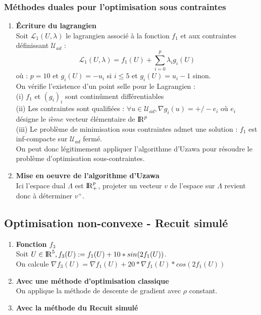 \documentclass[a4paper]{article}
\begin{document}
\subsubsection{Méthodes duales pour l'optimisation sous contraintes}


\begin{enumerate}
\item \textbf{Écriture du lagrangien}
\vspace{0.1cm}
\\ Soit $\mathcal{L}_{1}(U,\lambda)$ le lagrangien associé à la fonction $f_1$ et aux contraintes définissant $\mathcal{U}_{ad}$ : 
\[ \mathcal{L}_{1}(U,\lambda) = f_1(U) + \sum_{i = 0}^{p} \lambda_i g_i(U) \]
où : $p = 10$ et $g_i(U) = -u_i$ si $i \le 5$ et $g_i(U) = u_i-1$ sinon. 
\vspace{0.1cm}
\\ On vérifie l'existence d'un point selle pour le Lagrangien : 
\vspace{0.1cm}
\\ (i) $f_1$ et $(g_i)_i$ sont continûment différentiables
\\ (ii) Les contraintes sont qualifiées : $\forall{} u \in \mathcal{U}_{ad}, \nabla g_i(u) = +/- e_i$ où $e_i$ désigne le $ième$ vecteur élémentaire de ${\rm I\!R}^p$
\\ (iii) Le problème de minimisation sous contraintes admet une solution : $f_1$ est inf-compacte sur $\mathcal{U}_{ad}$ fermé.
\vspace{0.2cm}
\\ On peut donc légitimement appliquer l'algorithme d'Uzawa pour résoudre le problème d'optimisation sous-contraintes.
\item \textbf{Mise en oeuvre de l'algorithme d'Uzawa}
\vspace{0.1cm}
\\ Ici l'espace dual $\Lambda$ est ${\rm I\!R}^p_+$, projeter un vecteur $v$ de l'espace sur $\Lambda$ revient donc à déterminer $v^+$.

\end{enumerate}

\subsection{Optimisation non-convexe - Recuit simulé}

\begin{enumerate}
\item \textbf{Fonction $f_3$}
\vspace{0.1cm}
\\ Soit $U \in {\rm I\!R}^5, f_3(U) := f_1(U) + 10*sin(2f_1(U))$.
\\ On calcule $\nabla f_3(U) = \nabla f_1(U) + 20*\nabla f_1(U)*cos(2f_1(U)) $
\item \textbf{Avec une méthode d'optimisation classique}
\vspace{0.1cm}
\\ On applique la méthode de descente de gradient avec $\rho$ constant.
\item \textbf{Avec la méthode du Recuit simulé}
\vspace{0.1cm}
\end{enumerate}
\end{document}
